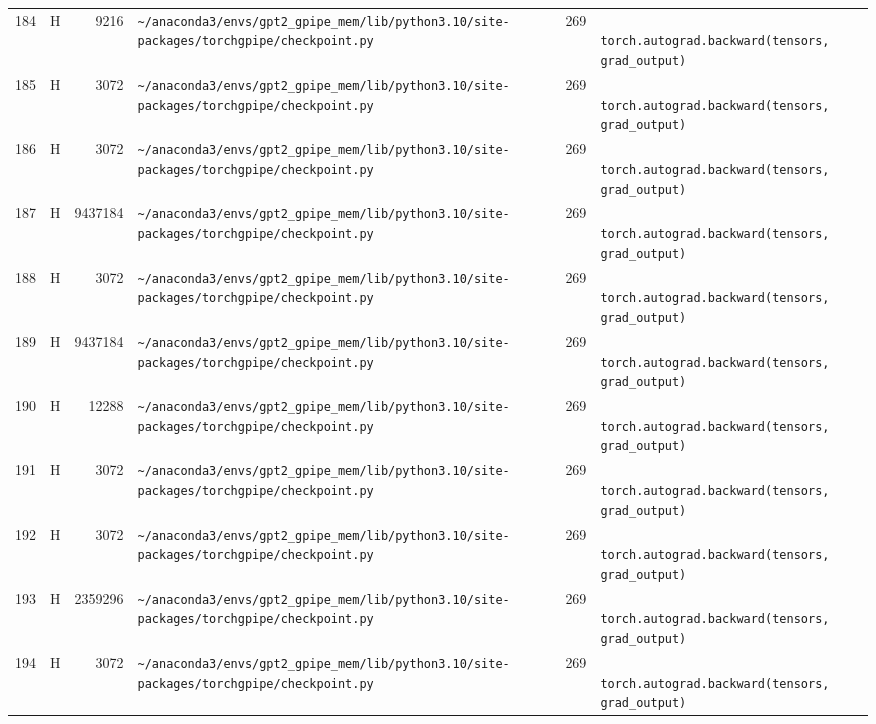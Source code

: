 \documentclass{article}
\begin{document}
\begin{longtable}{r l r p{6.5cm} r p{7.0cm}}
184 & H & 9216 & \lstinline|~/anaconda3/envs/gpt2_gpipe_mem/lib/python3.10/site-packages/torchgpipe/checkpoint.py| & 269 & \lstinline|            torch.autograd.backward(tensors, grad_output)| \\
185 & H & 3072 & \lstinline|~/anaconda3/envs/gpt2_gpipe_mem/lib/python3.10/site-packages/torchgpipe/checkpoint.py| & 269 & \lstinline|            torch.autograd.backward(tensors, grad_output)| \\
186 & H & 3072 & \lstinline|~/anaconda3/envs/gpt2_gpipe_mem/lib/python3.10/site-packages/torchgpipe/checkpoint.py| & 269 & \lstinline|            torch.autograd.backward(tensors, grad_output)| \\
187 & H & 9437184 & \lstinline|~/anaconda3/envs/gpt2_gpipe_mem/lib/python3.10/site-packages/torchgpipe/checkpoint.py| & 269 & \lstinline|            torch.autograd.backward(tensors, grad_output)| \\
188 & H & 3072 & \lstinline|~/anaconda3/envs/gpt2_gpipe_mem/lib/python3.10/site-packages/torchgpipe/checkpoint.py| & 269 & \lstinline|            torch.autograd.backward(tensors, grad_output)| \\
189 & H & 9437184 & \lstinline|~/anaconda3/envs/gpt2_gpipe_mem/lib/python3.10/site-packages/torchgpipe/checkpoint.py| & 269 & \lstinline|            torch.autograd.backward(tensors, grad_output)| \\
190 & H & 12288 & \lstinline|~/anaconda3/envs/gpt2_gpipe_mem/lib/python3.10/site-packages/torchgpipe/checkpoint.py| & 269 & \lstinline|            torch.autograd.backward(tensors, grad_output)| \\
191 & H & 3072 & \lstinline|~/anaconda3/envs/gpt2_gpipe_mem/lib/python3.10/site-packages/torchgpipe/checkpoint.py| & 269 & \lstinline|            torch.autograd.backward(tensors, grad_output)| \\
192 & H & 3072 & \lstinline|~/anaconda3/envs/gpt2_gpipe_mem/lib/python3.10/site-packages/torchgpipe/checkpoint.py| & 269 & \lstinline|            torch.autograd.backward(tensors, grad_output)| \\
193 & H & 2359296 & \lstinline|~/anaconda3/envs/gpt2_gpipe_mem/lib/python3.10/site-packages/torchgpipe/checkpoint.py| & 269 & \lstinline|            torch.autograd.backward(tensors, grad_output)| \\
194 & H & 3072 & \lstinline|~/anaconda3/envs/gpt2_gpipe_mem/lib/python3.10/site-packages/torchgpipe/checkpoint.py| & 269 & \lstinline|            torch.autograd.backward(tensors, grad_output)| \\

\end{longtable}
\end{document}
